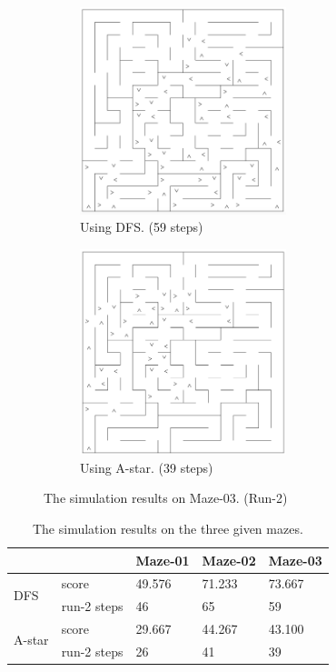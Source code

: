 \documentclass[11pt, oneside]{article}   	%
\begin{document}
\begin{figure}
\centering
\begin{subfigure}{7cm}
  \centering
  \includegraphics[width=6cm]{maze-03-dfs.png}
  \caption{Using DFS. (59 steps)}
  \label{fig:maze-03-dfs}
\end{subfigure}%
\begin{subfigure}{7cm}
  \centering
  \includegraphics[width=6cm]{maze-03-astar-h1.png}
  \caption{Using A-star. (39 steps)}
  \label{fig:maze-03-astar-h1}
\end{subfigure}
\caption{The simulation results on Maze-03. (Run-2)}
\label{fig:maze-03}
\end{figure}


\begin{table}[]
\centering
\caption{The simulation results on the three given mazes.}
\label{tab:result1}
\begin{tabular}{lllll}
\hline
                        &             & Maze-01 & Maze-02 & Maze-03 \\ \hline
\multirow{2}{*}{DFS}    & score       & 49.576  & 71.233  & 73.667  \\  
                        & run-2 steps & 46      & 65      & 59      \\ \hline
\multirow{2}{*}{A-star} & score       & 29.667  & 44.267  & 43.100  \\ 
                        & run-2 steps & 26      & 41      & 39      \\ \hline
\end{tabular}
\end{table}
\end{document}
